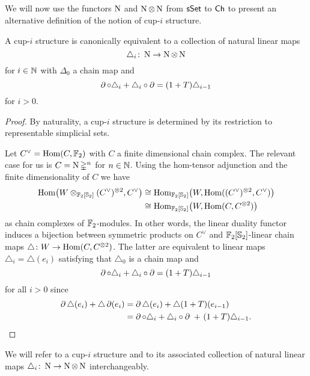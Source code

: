 
\subsection{}

We will now use the functors $\operatorname{N}$ and $\operatorname{N} \otimes \operatorname{N}$ from $\mathsf{sSet}$ to $\mathsf{Ch}$ to present an alternative definition of the notion of cup-$i$ structure.

\begin{lemma} \label{l:cup-i construction coalgebra}
	A cup-$i$ structure is canonically equivalent to a collection of natural linear maps
	\[
	\triangle_i \colon \operatorname{N} \to \operatorname{N} \otimes \operatorname{N}
	\]
	for $i \in \mathbb{N}$ with $\Delta_0$ a chain map and
	\[
	\operatorname{\partial} \circ \triangle_i + \triangle_i \circ \operatorname{\partial} =
	(1+T) \triangle_{i-1}
	\]
	for $i > 0$.
\end{lemma}

\begin{proof}
	By naturality, a cup-$i$ structure is determined by its restriction to representable simplicial sets.

	Let $C^\vee = \mathrm{Hom}(C, {\mathbb{F}_2})$ with $C$ a finite dimensional chain complex.
	The relevant case for us is $C = \operatorname{N} \mathbb{\Delta}^n$ for $n \in \mathbb{N}$.
	Using the hom-tensor adjunction and the finite dimensionality of $C$ we have
	\begin{align*}
	\mathrm{Hom} \big(W \otimes_{{\mathbb{F}_2}[\mathbb{S}_2]} (C^\vee)^{\otimes 2}, C^\vee \big) & \cong
	\mathrm{Hom}_{{\mathbb{F}_2}[\mathbb{S}_2]} \big( W, \mathrm{Hom}((C^\vee)^{\otimes 2}, C^\vee) \big) \\ & \cong
	\mathrm{Hom}_{{\mathbb{F}_2}[\mathbb{S}_2]} \big( W, \mathrm{Hom}(C, C^{\otimes 2}) \big)
	\end{align*}
	as chain complexes of ${\mathbb{F}_2}$-modules.
	In other words, the linear duality functor induces a bijection between symmetric products on $C^\vee$ and ${\mathbb{F}_2}[\mathbb{S}_2]$-linear chain maps $\triangle \colon W \to \mathrm{Hom}(C, C^{\otimes 2})$.
	The latter are equivalent to linear maps $\triangle_i = \triangle(e_i)$ satisfying that $\triangle_0$ is a chain map and
	\[
	\operatorname{\partial} \circ \triangle_i + \triangle_i \circ \operatorname{\partial} =
	(1+T) \triangle_{i-1}
	\]
	for all $i > 0$ since
	\begin{align*}
	\operatorname{\partial} \triangle (e_i) + \triangle \operatorname{\partial}(e_i) &=
	\operatorname{\partial} \triangle (e_i) + \triangle (1+T) (e_{i-1}) \\ &=
	\operatorname{\partial} \circ \triangle_i + \triangle_i \circ \operatorname{\partial} \ +\ (1+T) \triangle_{i-1}.
	\end{align*}
\end{proof}

We will refer to a cup-$i$ structure and to its associated collection of natural linear maps $\triangle_i \colon \operatorname{N} \to \operatorname{N} \otimes \operatorname{N}$ interchangeably.


